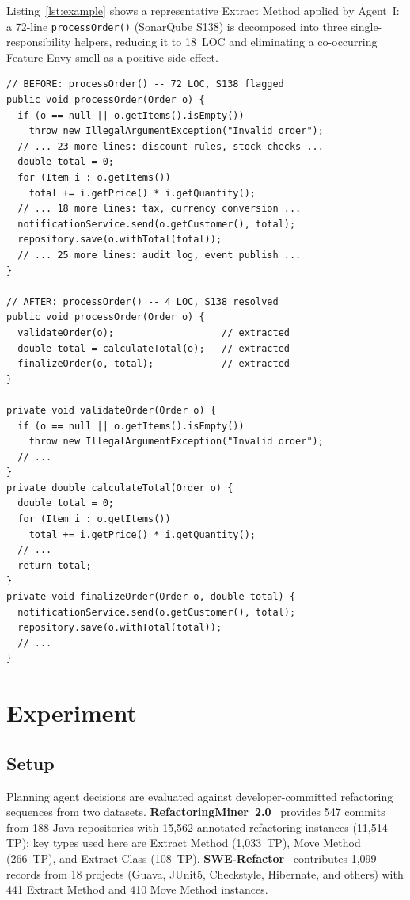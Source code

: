 \documentclass[conference]{IEEEtran}
\begin{document}
Listing~\ref{lst:example} shows a representative Extract Method applied by Agent~I:
a 72-line \texttt{processOrder()} (SonarQube S138) is decomposed into three
single-responsibility helpers, reducing it to 18~LOC and eliminating a
co-occurring Feature Envy smell as a positive side effect.

\begin{lstlisting}[caption={Long Method (top) refactored by Agent~I via Extract Method (bottom).},label={lst:example}]
// BEFORE: processOrder() -- 72 LOC, S138 flagged
public void processOrder(Order o) {
  if (o == null || o.getItems().isEmpty())
    throw new IllegalArgumentException("Invalid order");
  // ... 23 more lines: discount rules, stock checks ...
  double total = 0;
  for (Item i : o.getItems())
    total += i.getPrice() * i.getQuantity();
  // ... 18 more lines: tax, currency conversion ...
  notificationService.send(o.getCustomer(), total);
  repository.save(o.withTotal(total));
  // ... 25 more lines: audit log, event publish ...
}

// AFTER: processOrder() -- 4 LOC, S138 resolved
public void processOrder(Order o) {
  validateOrder(o);                   // extracted
  double total = calculateTotal(o);   // extracted
  finalizeOrder(o, total);            // extracted
}

private void validateOrder(Order o) {
  if (o == null || o.getItems().isEmpty())
    throw new IllegalArgumentException("Invalid order");
  // ...
}
private double calculateTotal(Order o) {
  double total = 0;
  for (Item i : o.getItems())
    total += i.getPrice() * i.getQuantity();
  // ...
  return total;
}
private void finalizeOrder(Order o, double total) {
  notificationService.send(o.getCustomer(), total);
  repository.save(o.withTotal(total));
  // ...
}
\end{lstlisting}

\section{Experiment}

\subsection{Setup}

Planning agent decisions are evaluated against developer-committed refactoring
sequences from two datasets.
\textbf{RefactoringMiner~2.0}~\cite{tsantalis2022refactoringminer} provides
547 commits from 188 Java repositories with 15,562 annotated refactoring
instances (11,514 TP); key types used here are Extract Method (1,033~TP),
Move Method (266~TP), and Extract Class (108~TP).
\textbf{SWE-Refactor}~\cite{swerefactor2025} contributes 1,099 records from
18 projects (Guava, JUnit5, Checkstyle, Hibernate, and others) with 441
Extract Method and 410 Move Method instances.
\end{document}

